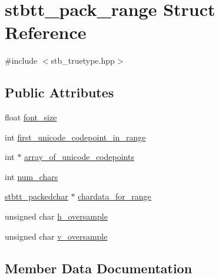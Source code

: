 \hypertarget{structstbtt__pack__range}{}\section{stbtt\+\_\+pack\+\_\+range Struct Reference}
\label{structstbtt__pack__range}


{\ttfamily \#include $<$stb\+\_\+truetype.\+hpp$>$}

\subsection*{Public Attributes}
\begin{DoxyCompactItemize}
\item 
float \hyperlink{structstbtt__pack__range_a296916dc971e5e7627822fe98dc42828}{font\+\_\+size}
\item 
int \hyperlink{structstbtt__pack__range_a3b414cbee1e164c29dd138e0ae3d5759}{first\+\_\+unicode\+\_\+codepoint\+\_\+in\+\_\+range}
\item 
int $\ast$ \hyperlink{structstbtt__pack__range_a1567aa5455e1251529a91b46261368cf}{array\+\_\+of\+\_\+unicode\+\_\+codepoints}
\item 
int \hyperlink{structstbtt__pack__range_a046d65b6ffb65fb998d471ba098e2e23}{num\+\_\+chars}
\item 
\hyperlink{structstbtt__packedchar}{stbtt\+\_\+packedchar} $\ast$ \hyperlink{structstbtt__pack__range_aa8f7ddd637ed341ea39b08466fab9284}{chardata\+\_\+for\+\_\+range}
\item 
unsigned char \hyperlink{structstbtt__pack__range_a7a642139ce446c58fde5c48553bcf008}{h\+\_\+oversample}
\item 
unsigned char \hyperlink{structstbtt__pack__range_a6288f14006e257544db3d015c32b4113}{v\+\_\+oversample}
\end{DoxyCompactItemize}


\subsection{Member Data Documentation}
\hypertarget{structstbtt__pack__range_a1567aa5455e1251529a91b46261368cf}{}\label{structstbtt__pack__range_a1567aa5455e1251529a91b46261368cf} 
